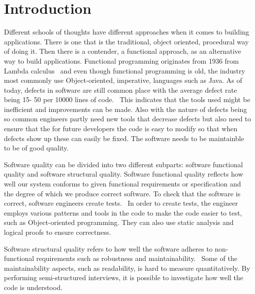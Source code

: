 \chapter{Introduction}\label{introduction}

Different schools of thoughts have different approaches when it comes to
building applications. There is one that is the traditional, object oriented,
procedural way of doing it. Then there is a contender, a functional approach, as
an alternative way to build applications. Functional programming originates from
1936 from Lambda calculus~\cite{Turner} and even though functional programming
is old, the industry most commonly use Object-oriented, imperative, languages
such as Java. As of today, defects in software are still common place with the
average defect rate being 15- 50 per 10000 lines of
code.~\cite{McConnell:2004:CCS:1096143} This indicates that the tools used might
be inefficient and improvements can be made. Also with the nature of defects
being so common engineers partly need new tools that decrease defects but also
need to ensure that the for future developers the code is easy to modify so that
when defects show up these can easily be fixed. The software needs to be
maintainble to be of good quality.

Software quality can be divided into two different subparts: software functional
quality and software structural quality. Software functional quality reflects
how well our system conforms to given functional requirements or specification
and the degree of which we produce correct software.  To check that the software
is correct, software engineers create tests.~\cite{Pressman:2004:SEP:994110} In
order to create tests, the engineer employs various patterns and tools in the
code to make the code easier to test, such as Object-oriented programming. They
can also use static analysis and logical proofs to ensure correctness. 

Software structural quality refers to how well the software adheres to
non-functional requirements such as robustness and
maintainability.~\cite{Pressman:2004:SEP:994110} Some of the maintainability
aspects, such as readability, is hard to measure quantitatively. By performing
semi-structured interviews, it is possible to investigate how well the code is
understood. 

